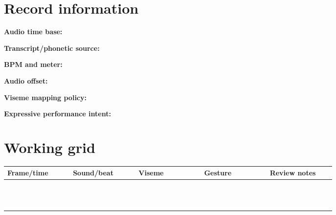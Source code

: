 \documentclass[10pt,letterpaper]{article}
\begin{document}
\makedoctitle
\makedocsummary

\section{Record information}
\noindent\textbf{Audio time base:}\quad\hrulefill\par\vspace{10pt}
\noindent\textbf{Transcript/phonetic source:}\quad\hrulefill\par\vspace{10pt}
\noindent\textbf{BPM and meter:}\quad\hrulefill\par\vspace{10pt}
\noindent\textbf{Audio offset:}\quad\hrulefill\par\vspace{10pt}
\noindent\textbf{Viseme mapping policy:}\quad\hrulefill\par\vspace{10pt}
\noindent\textbf{Expressive performance intent:}\quad\hrulefill\par\vspace{10pt}\section{Working grid}
\begin{longtable}{|p{0.156\linewidth}|p{0.156\linewidth}|p{0.156\linewidth}|p{0.156\linewidth}|p{0.156\linewidth}|}
\hline
\textbf{Frame/time} & \textbf{Sound/beat} & \textbf{Viseme} & \textbf{Gesture} & \textbf{Review notes}\\\hline
\endhead
\rule{0pt}{20pt} &  &  &  & \\\hline
\rule{0pt}{20pt} &  &  &  & \\\hline
\rule{0pt}{20pt} &  &  &  & \\\hline
\rule{0pt}{20pt} &  &  &  & \\\hline
\rule{0pt}{20pt} &  &  &  & \\\hline
\rule{0pt}{20pt} &  &  &  & \\\hline
\rule{0pt}{20pt} &  &  &  & \\\hline
\rule{0pt}{20pt} &  &  &  & \\\hline
\rule{0pt}{20pt} &  &  &  & \\\hline
\rule{0pt}{20pt} &  &  &  & \\\hline
\rule{0pt}{20pt} &  &  &  & \\\hline
\rule{0pt}{20pt} &  &  &  & \\\hline
\end{longtable}
\end{document}
